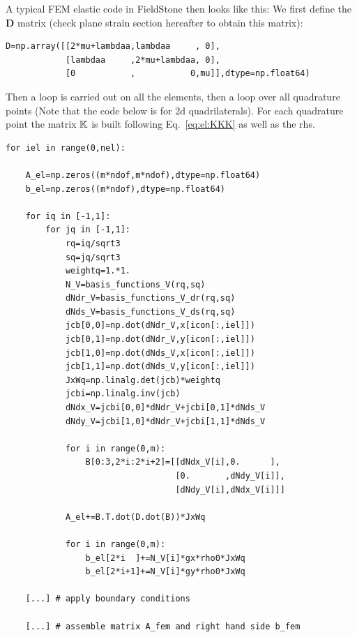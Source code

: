 A typical FEM elastic code in FieldStone then looks like this:
We first define the ${\bm D}$ matrix (check plane strain section hereafter
to obtain this matrix):
\begin{lstlisting}
D=np.array([[2*mu+lambdaa,lambdaa     , 0],
            [lambdaa     ,2*mu+lambdaa, 0],
            [0           ,           0,mu]],dtype=np.float64) 
\end{lstlisting}

Then a loop is carried out on all the elements, then a loop over all quadrature points
(Note that the code below is for 2d quadrilaterals).
For each quadrature point the matrix ${\mathbb{K}}$ is built following Eq.~\eqref{eq:el:KKK}
as well as the rhs. 


\begin{lstlisting}
for iel in range(0,nel):

    A_el=np.zeros((m*ndof,m*ndof),dtype=np.float64)
    b_el=np.zeros((m*ndof),dtype=np.float64)

    for iq in [-1,1]:
        for jq in [-1,1]:
            rq=iq/sqrt3
            sq=jq/sqrt3
            weightq=1.*1.
            N_V=basis_functions_V(rq,sq)
            dNdr_V=basis_functions_V_dr(rq,sq)
            dNds_V=basis_functions_V_ds(rq,sq)
            jcb[0,0]=np.dot(dNdr_V,x[icon[:,iel]])
            jcb[0,1]=np.dot(dNdr_V,y[icon[:,iel]])
            jcb[1,0]=np.dot(dNds_V,x[icon[:,iel]])
            jcb[1,1]=np.dot(dNds_V,y[icon[:,iel]])
            JxWq=np.linalg.det(jcb)*weightq
            jcbi=np.linalg.inv(jcb)
            dNdx_V=jcbi[0,0]*dNdr_V+jcbi[0,1]*dNds_V
            dNdy_V=jcbi[1,0]*dNdr_V+jcbi[1,1]*dNds_V

            for i in range(0,m):
                B[0:3,2*i:2*i+2]=[[dNdx_V[i],0.      ],
                                  [0.       ,dNdy_V[i]],
                                  [dNdy_V[i],dNdx_V[i]]]

            A_el+=B.T.dot(D.dot(B))*JxWq

            for i in range(0,m):
                b_el[2*i  ]+=N_V[i]*gx*rho0*JxWq
                b_el[2*i+1]+=N_V[i]*gy*rho0*JxWq

    [...] # apply boundary conditions

    [...] # assemble matrix A_fem and right hand side b_fem

\end{lstlisting}







